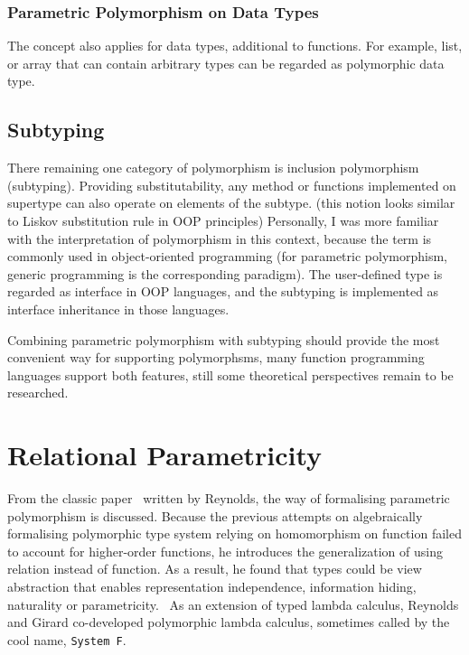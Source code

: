 \documentclass[sigconf]{acmart}
\begin{document}
\subsubsection{Parametric Polymorphism on Data Types}

The concept also applies for data types, additional to functions. For example, list, or array that can contain arbitrary types can be regarded as polymorphic data type.


\subsection{Subtyping}

There remaining one category of polymorphism is inclusion polymorphism (subtyping). Providing substitutability, any method or functions implemented on supertype can also operate on elements of the subtype. (this notion looks similar to Liskov substitution rule in OOP principles) Personally, I was more familiar with the interpretation of polymorphism in this context, because the term is commonly used in object-oriented programming (for parametric polymorphism, generic programming is the corresponding paradigm). The user-defined type is regarded as interface in OOP languages, and the subtyping is implemented as interface inheritance in those languages.

Combining parametric polymorphism with subtyping should provide the most convenient way for supporting polymorphsms, many function programming languages support both features, still some theoretical perspectives remain to be researched.


\section{Relational Parametricity}
\label{sec:relparam}

From the classic paper~\cite{ParametricPolymorphism} written by Reynolds, the way of formalising parametric polymorphism is discussed. Because the previous attempts on algebraically formalising polymorphic type system relying on homomorphism on function failed to account for higher-order functions, he introduces the generalization of using relation instead of function. As a result, he found that types could be view abstraction that enables representation independence, information hiding, naturality or parametricity.~\cite{2013dedicate} As an extension of typed lambda calculus, Reynolds and Girard co-developed polymorphic lambda calculus, sometimes called by the cool name, \texttt{System F}. 
\end{document}
